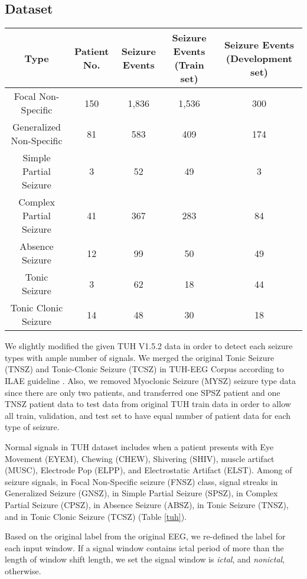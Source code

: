 \documentclass[pmlr,twocolumn,10pt]{jmlr}
\begin{document}
\subsection{Dataset}
\label{sec: app_dataset}
\begin{table*}[h!]
    \footnotesize
	\centering
	\caption{Construction of Temple University Hospital v 1.5.2 Dataset}
	\label{tuh}
	\begin{tabular}{c|cccc}
		\toprule
		Type & Patient No. & Seizure Events & Seizure Events (Train set) & Seizure Events (Development set) \\
		\midrule
		Focal Non-Specific & 150 &  1,836  & 1,536 & 300 \\
		Generalized Non-Specific  & 81 & 583 & 409 & 174 \\
		Simple Partial Seizure & 3 & 52 & 49 & 3 \\
		Complex Partial Seizure   & 41 & 367 & 283 & 84 \\
		Absence Seizure  & 12  & 99 & 50 & 49 \\
		Tonic Seizure  & 3  & 62 & 18 & 44 \\
		Tonic Clonic Seizure  & 14 & 48 & 30 & 18 \\
\bottomrule
	\end{tabular}
\end{table*} 
We slightly modified the given TUH V1.5.2 data in order to detect each seizure types with ample number of signals. We merged the original Tonic Seizure (TNSZ) and Tonic-Clonic Seizure (TCSZ) in TUH-EEG Corpus according to  ILAE guideline \citep{scheffer2017ilae}. Also, we removed Myoclonic Seizure (MYSZ) seizure type data since there are only two patients, and transferred one SPSZ patient and one TNSZ patient data to test data from original TUH train data in order to allow all train, validation, and test set to have equal number of patient data for each type of seizure. 

Normal signals in TUH dataset includes when a patient presents with Eye Movement (EYEM), Chewing (CHEW), Shivering (SHIV), muscle artifact (MUSC), Electrode Pop (ELPP), and Electrostatic Artifact (ELST). Among  of seizure signals,  in Focal Non-Specific seizure (FNSZ) class,  signal streaks in Generalized Seizure (GNSZ),   in Simple Partial Seizure (SPSZ),  in Complex Partial Seizure (CPSZ),  in Absence Seizure (ABSZ),  in Tonic Seizure (TNSZ), and  in Tonic Clonic Seizure (TCSZ) (Table \ref{tuh}). 

Based on the original label from the original EEG, we re-defined the label for each input window. If a signal window contains ictal period of more than the length of window shift length, we set the signal window is \textit{ictal}, and \textit{nonictal}, otherwise.
\end{document}
